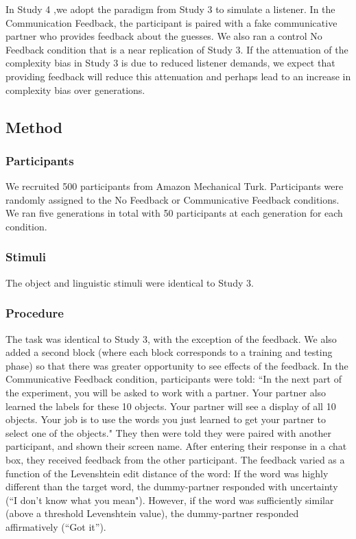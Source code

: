 In Study 4 ,we adopt the paradigm from Study 3 to simulate a listener. In the Communication Feedback, the participant is paired with a fake communicative partner who provides feedback about the guesses. We also ran a control No Feedback condition that is a near replication of Study 3. If the attenuation of the complexity bias in Study 3 is due to reduced listener demands, we expect that providing feedback will reduce this attenuation and perhaps lead to an increase in complexity bias over generations. 

\subsection{Method}

\subsubsection{Participants}
We recruited 500 participants from Amazon Mechanical Turk. Participants were randomly assigned to the No Feedback or Communicative Feedback conditions. We ran five generations in total with 50 participants at each generation for each condition.

\subsubsection{Stimuli}
The object and linguistic stimuli were identical to Study 3.

\subsubsection{Procedure}
The task was identical to Study 3, with the exception of the feedback. We also added a second block (where each block corresponds to a training and testing phase) so that there was greater opportunity to see effects of the feedback. In the Communicative Feedback condition, participants were told: ``In the next part of the experiment, you will be asked to work with a partner. Your partner also learned the labels for these 10 objects. Your partner will see a display of all 10 objects. Your job is to use the words you just learned to get your partner to select one of the objects." They then were  told they were paired with another participant, and shown their screen name. After entering their response in a chat box, they received feedback from the other participant. The feedback varied as a function of the Levenshtein edit distance of the word: If the word was highly different than the target word, the  dummy-partner responded with uncertainty (``I don't know what you mean"). However, if the word was sufficiently similar (above a threshold Levenshtein value), the dummy-partner responded affirmatively (``Got it'').

